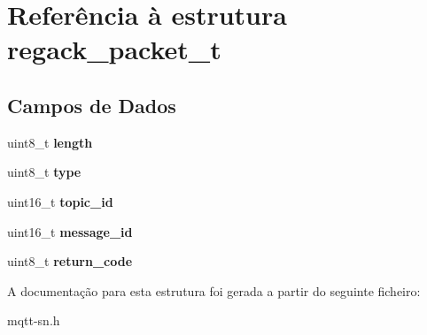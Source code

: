 \hypertarget{structregack__packet__t}{\section{Referência à estrutura regack\+\_\+packet\+\_\+t}
\label{structregack__packet__t}
}
\subsection*{Campos de Dados}
\begin{DoxyCompactItemize}
\item 
\hypertarget{structregack__packet__t_ab2b3adeb2a67e656ff030b56727fd0ac}{uint8\+\_\+t {\bfseries length}}\label{structregack__packet__t_ab2b3adeb2a67e656ff030b56727fd0ac}

\item 
\hypertarget{structregack__packet__t_a1d127017fb298b889f4ba24752d08b8e}{uint8\+\_\+t {\bfseries type}}\label{structregack__packet__t_a1d127017fb298b889f4ba24752d08b8e}

\item 
\hypertarget{structregack__packet__t_ad562f54acc5597130e0710c356963dff}{uint16\+\_\+t {\bfseries topic\+\_\+id}}\label{structregack__packet__t_ad562f54acc5597130e0710c356963dff}

\item 
\hypertarget{structregack__packet__t_aa9c217c6e58cdb2408e2ffbe9425289d}{uint16\+\_\+t {\bfseries message\+\_\+id}}\label{structregack__packet__t_aa9c217c6e58cdb2408e2ffbe9425289d}

\item 
\hypertarget{structregack__packet__t_aa72e4a685c5a553897adf56e0e60a61e}{uint8\+\_\+t {\bfseries return\+\_\+code}}\label{structregack__packet__t_aa72e4a685c5a553897adf56e0e60a61e}

\end{DoxyCompactItemize}


A documentação para esta estrutura foi gerada a partir do seguinte ficheiro\+:\begin{DoxyCompactItemize}
\item 
mqtt-\/sn.\+h\end{DoxyCompactItemize}
